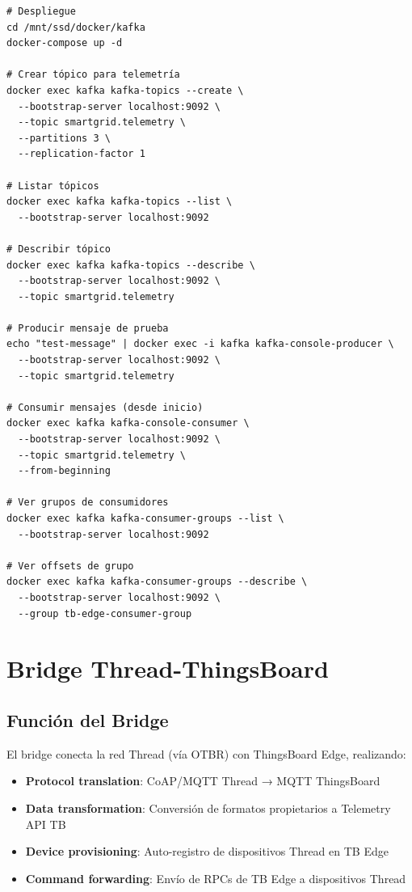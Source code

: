 \begin{verbatim}
# Despliegue
cd /mnt/ssd/docker/kafka
docker-compose up -d

# Crear tópico para telemetría
docker exec kafka kafka-topics --create \
  --bootstrap-server localhost:9092 \
  --topic smartgrid.telemetry \
  --partitions 3 \
  --replication-factor 1

# Listar tópicos
docker exec kafka kafka-topics --list \
  --bootstrap-server localhost:9092

# Describir tópico
docker exec kafka kafka-topics --describe \
  --bootstrap-server localhost:9092 \
  --topic smartgrid.telemetry

# Producir mensaje de prueba
echo "test-message" | docker exec -i kafka kafka-console-producer \
  --bootstrap-server localhost:9092 \
  --topic smartgrid.telemetry

# Consumir mensajes (desde inicio)
docker exec kafka kafka-console-consumer \
  --bootstrap-server localhost:9092 \
  --topic smartgrid.telemetry \
  --from-beginning

# Ver grupos de consumidores
docker exec kafka kafka-consumer-groups --list \
  --bootstrap-server localhost:9092

# Ver offsets de grupo
docker exec kafka kafka-consumer-groups --describe \
  --bootstrap-server localhost:9092 \
  --group tb-edge-consumer-group
\end{verbatim}

\section{Bridge Thread-ThingsBoard}

\subsection{Función del Bridge}

El bridge conecta la red Thread (vía OTBR) con ThingsBoard Edge, realizando:

\begin{itemize}
    \item \textbf{Protocol translation}: CoAP/MQTT Thread → MQTT ThingsBoard
    \item \textbf{Data transformation}: Conversión de formatos propietarios a Telemetry API TB
    \item \textbf{Device provisioning}: Auto-registro de dispositivos Thread en TB Edge
    \item \textbf{Command forwarding}: Envío de RPCs de TB Edge a dispositivos Thread
\end{itemize}

